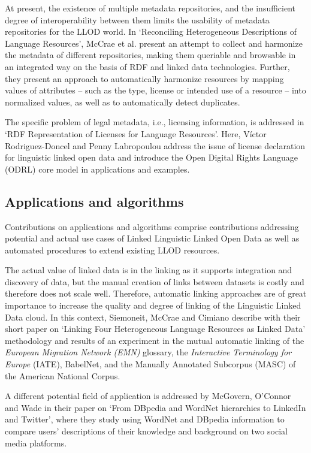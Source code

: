 At present, the existence of multiple metadata repositories, and the insufficient degree of interoperability between them limits the usability of metadata repositories for the LLOD world. 
In `Reconciling Heterogeneous Descriptions of Language Resources', McCrae et al. present an attempt to collect and harmonize the metadata of different repositories, making them queriable and browsable in an integrated way on the basis of RDF and linked data technologies. Further, they present an approach to automatically harmonize resources by mapping values of attributes -- such as the type, license or intended use of a resource -- into normalized values, as well as to automatically detect duplicates.

The specific problem of legal metadata, i.e., licensing information, is addressed in `RDF Representation of Licenses for Language Resources'. 
Here, Víctor Rodriguez-Doncel and Penny Labropoulou address the issue of license declaration for linguistic linked open data and introduce the Open Digital Rights Language (ODRL) core model in applications and examples.

\subsection{Applications and algorithms}

Contributions on applications and algorithms comprise contributions addressing potential and actual use cases of Linked Linguistic Linked Open Data as well as automated procedures to extend existing LLOD resources.

The actual value of linked data is in the linking as it supports integration and discovery of data, but the manual creation of links between datasets is costly and therefore does not scale well. Therefore, automatic linking approaches are of great importance to increase the quality and degree of linking of the Linguistic Linked Data cloud.
In this context, Siemoneit, McCrae and Cimiano describe with their short paper on `Linking Four Heterogeneous Language Resources as Linked Data' methodology and results of an experiment in the mutual automatic linking of the \emph{European Migration Network (EMN)} glossary, the \emph{Interactive Terminology for Europe} (IATE), BabelNet, and the Manually Annotated Subcorpus (MASC) of the American National Corpus.

A different potential field of application is addressed by McGovern, O'Connor and Wade in their paper on `From DBpedia and WordNet hierarchies to LinkedIn and Twitter', where they study using WordNet and DBpedia information to compare users' descriptions of their knowledge and background on two social media platforms.

